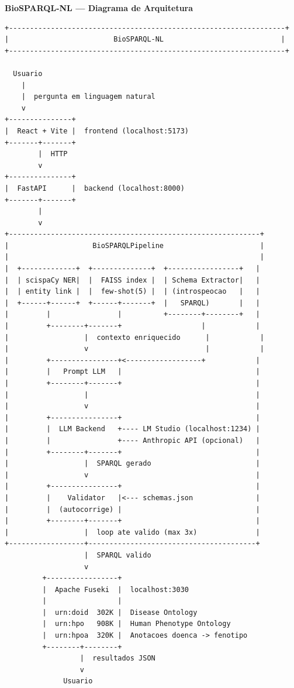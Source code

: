 \documentclass[a4paper,12pt]{article}
\begin{document}
\begin{center}
{\Large\textbf{BioSPARQL-NL --- Diagrama de Arquitetura}}
\end{center}

\vspace{1em}

\begin{Verbatim}[fontsize=\small,baselinestretch=1.0]
+------------------------------------------------------------------+
|                         BioSPARQL-NL                            |
+------------------------------------------------------------------+

  Usuario
    |
    |  pergunta em linguagem natural
    v
+---------------+
|  React + Vite |  frontend (localhost:5173)
+-------+-------+
        |  HTTP
        v
+---------------+
|  FastAPI      |  backend (localhost:8000)
+-------+-------+
        |
        v
+------------------------------------------------------------+
|                    BioSPARQLPipeline                       |
|                                                            |
|  +-------------+  +--------------+  +-----------------+   |
|  | scispaCy NER|  |  FAISS index |  | Schema Extractor|   |
|  | entity link |  |  few-shot(5) |  | (introspeocao   |   |
|  +------+------+  +------+-------+  |   SPARQL)       |   |
|         |                |          +--------+--------+   |
|         +--------+-------+                   |            |
|                  |  contexto enriquecido      |            |
|                  v                            |            |
|         +----------------+<------------------+            |
|         |   Prompt LLM   |                                |
|         +--------+-------+                                |
|                  |                                        |
|                  v                                        |
|         +----------------+                                |
|         |  LLM Backend   +---- LM Studio (localhost:1234) |
|         |                +---- Anthropic API (opcional)   |
|         +--------+-------+                                |
|                  |  SPARQL gerado                         |
|                  v                                        |
|         +----------------+                                |
|         |    Validator   |<--- schemas.json               |
|         |  (autocorrige) |                                |
|         +--------+-------+                                |
|                  |  loop ate valido (max 3x)              |
+------------------+----------------------------------------+
                   |  SPARQL valido
                   v
         +-----------------+
         |  Apache Fuseki  |  localhost:3030
         |                 |
         |  urn:doid  302K |  Disease Ontology
         |  urn:hpo   908K |  Human Phenotype Ontology
         |  urn:hpoa  320K |  Anotacoes doenca -> fenotipo
         +--------+--------+
                  |  resultados JSON
                  v
              Usuario
\end{Verbatim}
\end{document}
